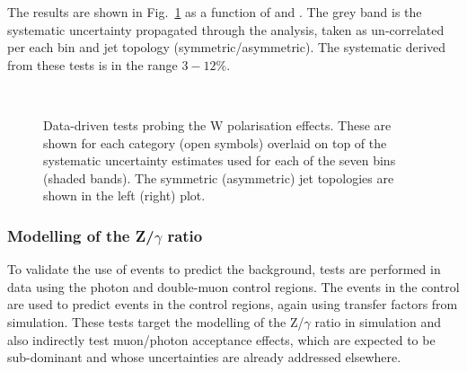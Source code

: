 The results are shown in Fig.~\ref{fig:closureMuPToMuM} as a function
of \scalht and \njet.  The grey band is the systematic uncertainty
propagated through the analysis, taken as un-correlated per each
\scalht bin and jet topology (symmetric/asymmetric). The systematic
derived from these tests is in the range $3-12\%$.

\begin{figure}[h!]
  \begin{center}
    ~~
    \caption{Data-driven tests probing the W polarisation effects. 
      These are shown for each
      \njet category (open symbols) overlaid on top of the systematic
      uncertainty estimates used for each of the seven \scalht bins
      (shaded bands). 
      The symmetric (asymmetric) jet topologies are shown in the left (right) plot.       
    }
    \label{fig:closureMuPToMuM}
  \end{center} 
\end{figure}

\subsubsection*{Modelling of the Z/$\gamma$ ratio}
\label{sec:tfSyst_ZGratio}
To validate the use of \gj events to predict the \znunu background,
tests are performed in data using the photon and double-muon control
regions. The events in the \gj control are used to predict events in
the \mmj control regions, again using transfer factors from simulation.
These tests target the modelling of the Z/$\gamma$ ratio in simulation
and also indirectly test muon/photon acceptance effects, which
are expected to be sub-dominant and whose uncertainties are
already addressed elsewhere. 

